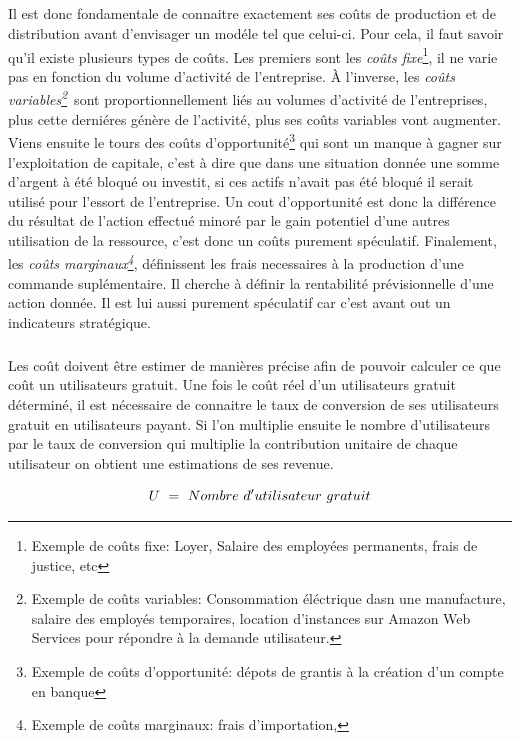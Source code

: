 \documentclass[11pt, a4paper ]{article}
\begin{document}
\begin{spacing}{1.5}
\subparagraph{}
Il est donc fondamentale de connaitre exactement ses coûts de production et de distribution avant d'envisager un modéle tel que celui-ci. Pour cela, il faut savoir qu'il existe plusieurs types de coûts.
Les premiers sont les \emph{coûts fixe}\footnote{Exemple de coûts fixe: Loyer, Salaire des employées permanents, frais de justice, etc}\cite{defCoutFixeEtVar}, il ne varie pas en fonction du volume d'activité de l'entreprise.
À l'inverse, les \emph{coûts variables\footnote{Exemple de coûts variables: Consommation éléctrique dasn une manufacture, salaire des employés temporaires, location d'instances sur Amazon Web Services pour répondre à la demande utilisateur.}\cite{defCoutFixeEtVar}}\ sont proportionnellement liés au volumes d'activité de l'entreprises, plus cette derniéres génère de l'activité, plus ses coûts variables vont augmenter.
Viens ensuite le tours des coûts d'opportunité\footnote{Exemple de coûts d'opportunité: dépots de grantis à la création d'un compte en banque }\cite{defCoutOpp} qui sont un manque à gagner sur l'exploitation de capitale, c'est à dire que dans une situation donnée une somme d'argent à été bloqué ou investit, si ces actifs n'avait pas été bloqué il serait utilisé pour l'essort de l'entreprise. Un cout d'opportunité est donc la différence du résultat de l'action effectué minoré par le gain potentiel d'une autres utilisation de la ressource, c'est donc un coûts purement spéculatif.
Finalement, les \emph{coûts marginaux\footnote{Exemple de coûts marginaux: frais d'importation, }}, définissent les frais necessaires à la production d'une commande suplémentaire. Il cherche à définir la rentabilité prévisionnelle d'une action donnée. Il est lui aussi purement spéculatif car c'est avant out un indicateurs stratégique.
\subparagraph{}
Les coût doivent être estimer de manières précise afin de pouvoir calculer ce que coût un utilisateurs gratuit. Une fois le coût réel d'un utilisateurs gratuit déterminé, il est nécessaire de connaitre le taux de conversion de ses utilisateurs gratuit en utilisateurs payant. Si l'on multiplie ensuite le nombre d'utilisateurs par le taux de conversion qui multiplie la contribution unitaire de chaque utilisateur on obtient une estimations de ses revenue\cite{equationFreemium}.

\begin{equation}\index{U!définition}
	U\ =\ Nombre\ d'utilisateur\ gratuit
\end{equation}



\end{spacing}
\end{document}
